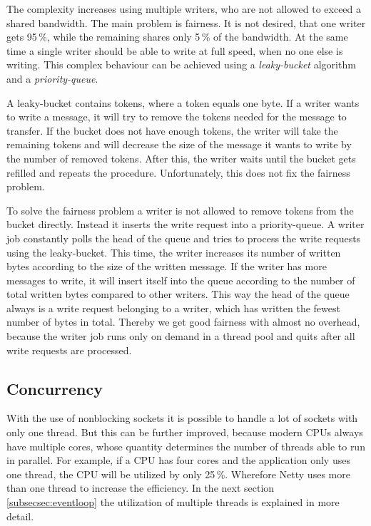 The complexity increases using multiple writers, who are not allowed to exceed a shared bandwidth. The main problem is fairness. It is not desired, that one writer gets 95\,\%, while the remaining shares only 5\,\% of the bandwidth. At the same time a single writer should be able to write at full speed, when no one else is writing. This complex behaviour can be achieved using a \emph{leaky-bucket} algorithm and a \emph{priority-queue}.

A leaky-bucket contains tokens, where a token equals one byte. If a writer wants to write a message, it will try to remove the tokens needed for the message to transfer. If the bucket does not have enough tokens, the writer will take the remaining tokens and will decrease the size of the message it wants to write by the number of removed tokens. After this, the writer waits until the bucket gets refilled and repeats the procedure. Unfortunately, this does not fix the fairness problem.

To solve the fairness problem a writer is not allowed to remove tokens from the bucket directly. Instead it inserts the write request into a priority-queue. A writer job constantly polls the head of the queue and tries to process the write requests using the leaky-bucket. This time, the writer increases its number of written bytes according to the size of the written message. If the writer has more messages to write, it will insert itself into the queue according to the number of total written bytes compared to other writers. This way the head of the queue always is a write request belonging to a writer, which has written the fewest number of bytes in total. Thereby we get good fairness with almost no overhead, because the writer job runs only on demand in a thread pool and quits after all write requests are processed.

\cleardoublepage
\subsection{Concurrency}
With the use of nonblocking sockets it is possible to handle a lot of sockets with only one thread. But this can be further improved, because modern CPUs always have multiple cores, whose quantity determines the number of threads able to run in parallel. For example, if a CPU has four cores and the application only uses one thread, the CPU will be utilized by only 25\,\%. Wherefore Netty uses more than one thread to increase the efficiency. In the next section \ref{subsecsec:eventloop} the utilization of multiple threads is explained in more detail.

